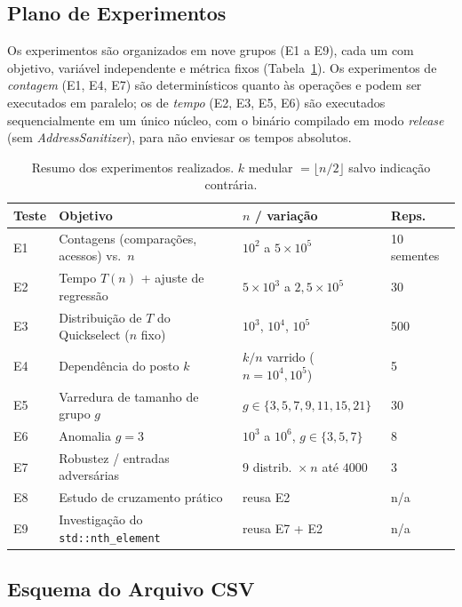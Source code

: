 \documentclass{infufrgs}
\begin{document}
\subsection{Plano de Experimentos}

Os experimentos são organizados em nove grupos (E1 a E9), cada um com objetivo, variável independente e métrica fixos (Tabela~\ref{tab:experimentos}). Os experimentos de \emph{contagem} (E1, E4, E7) são determinísticos quanto às operações e podem ser executados em paralelo; os de \emph{tempo} (E2, E3, E5, E6) são executados sequencialmente em um único núcleo, com o binário compilado em modo \emph{release} (sem \emph{AddressSanitizer}), para não enviesar os tempos absolutos.

\begin{table}[H]
\centering
\caption{Resumo dos experimentos realizados. $k$ medular $=\lfloor n/2 \rfloor$ salvo indicação contrária.}
\label{tab:experimentos}
\begin{tabular}{llll}
\toprule
\textbf{Teste} & \textbf{Objetivo} & \textbf{$n$ / variação} & \textbf{Reps.} \\
\midrule
E1 & Contagens (comparações, acessos) vs.\ $n$ & $10^2$ a $5{\times}10^5$ & 10 sementes \\
E2 & Tempo $T(n)$ + ajuste de regressão        & $5{\times}10^3$ a $2{,}5{\times}10^5$ & 30 \\
E3 & Distribuição de $T$ do Quickselect ($n$ fixo) & $10^3$, $10^4$, $10^5$ & 500 \\
E4 & Dependência do posto $k$                  & $k/n$ varrido ($n{=}10^4,10^5$) & 5 \\
E5 & Varredura de tamanho de grupo $g$         & $g \in \{3,5,7,9,11,15,21\}$ & 30 \\
E6 & Anomalia $g = 3$                          & $10^3$ a $10^6$, $g\in\{3,5,7\}$ & 8 \\
E7 & Robustez / entradas adversárias          & 9 distrib.\ $\times\ n$ até $4000$ & 3 \\
E8 & Estudo de cruzamento prático             & reusa E2 & n/a \\
E9 & Investigação do \texttt{std::nth\_element} & reusa E7 + E2 & n/a \\
\bottomrule
\end{tabular}
\end{table}

\subsection{Esquema do Arquivo CSV}
\end{document}
